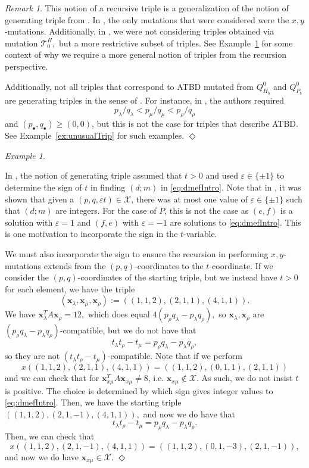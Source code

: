 \documentclass[11pt, reqno]{amsart}
\theoremstyle{remark}
\numberwithin{equation}{subsection}
\numberwithin{figure}{section}
\theoremstyle{customremark}
\newtheorem{rmk_no_diamond}[thm]{Remark}
\newenvironment{rmk}{\begin{rmk_no_diamond} } {\hfill$\er$ \end{rmk_no_diamond}}
\newtheorem{example_no_diamond}[thm]{Example}
\newenvironment{example}{\begin{example_no_diamond} } {\hfill$\er$ \end{example_no_diamond}}
\newcommand{\Tt}{\mathcal{T}}
\newcommand{\la}{{\lambda}}
\newcommand{\er}{{\Diamond}}
\newcommand{\eps}{\varepsilon}
\newcommand{\X}{\mathcal{X}}
\begin{document}
\begin{rmk}
    This notion of a recursive triple is a generalization of the notion of generating triple from \cite{MMW}. In \cite{MMW}, the only mutations that were considered were the $x,y$-mutations. Additionally, in \cite{MMW}, we were not considering triples obtained via mutation $\Tt_0^H,$ but a more restrictive subset of triples. See Example~\ref{ex:differentNotation} for some context of why we require a more general notion of triples from the recursion perspective. 
    
    Additionally, not all triples that correspond to ATBD mutated from $Q_{H_b}^0$ and $Q_{P_b}^0$ are generating triples in the sense of \cite{MMW}. For instance, in \cite{MMW}, the authors required
    \[ p_\la/q_\la<p_\mu/q_\mu<p_\rho/q_\rho\]
    and $(p_\bullet,q_\bullet)\geq(0,0)$, but this is not the case for triples that describe ATBD. See Example~\ref{ex:unusualTrip} for such examples.  
\end{rmk}

    \begin{example} \rm \label{ex:differentNotation}


In \cite{MMW}, the notion of generating triple assumed that $t>0$ and used $\eps \in \{\pm 1\}$ to determine the sign of $t$ in finding $(d;m)$ in \eqref{eq:dmefIntro}. Note that in \cite[Lemma 2.2.1]{MM}, it was shown that given a $(p,q,\eps t) \in \X$, there was at most one value of $\eps \in \{\pm 1\}$ such that $(d;m)$ are integers. For the case of $P$, this is not the case as $(e,f)$ is a solution with $\eps=1$ and $(f,e)$ with $\eps=-1$ are solutions to \eqref{eq:dmefIntro}. This is one motivation to incorporate the sign in the $t$-variable. 

We must also incorporate the sign to ensure the recursion in performing $x,y$-mutations extends from the $(p,q)$-coordinates to the $t$-coordinate. If we consider the $(p,q)$-coordinates of the starting triple, but we instead have $t>0$ for each element, we have the triple \[(\bm{x}_\la,\bm{x}_\mu,\bm{x}_\rho):=((1,1,2),(2,1,1),(4,1,1)).\] We have $\bm{x}_\la^T A\bm{x}_\rho=12,$ which does equal $4(p_\rho q_\la-p_\la q_\rho),$ so $\bm{x}_\la,\bm{x}_\rho$ are $(p_\rho q_\la-p_\la q_\rho)$-compatible, but we do not have that \[t_\la t_\rho-t_\mu=p_\rho q_\la-p_\la q_\rho,\] so they are not $(t_\la t_\rho-t_\mu)$-compatible. Note that if we perform \[x((1,1,2),(2,1,1),(4,1,1))=((1,1,2),(0,1,1),(2,1,1))\]
and we can check that for $\bm{x}_{x\mu}^TA\bm{x}_{x\mu} \neq 8$, i.e. $\bm{x}_{x\mu} \not\in \X.$ As such, we do not insist $t$ is positive. The choice is determined by which sign gives integer values to \eqref{eq:dmefIntro}. Then, we have the starting triple
$((1,1,2),(2,1,-1),(4,1,1)),$ and now we do have that 
\[ t_\la t_\rho-t_\mu=p_\rho q_\la-p_\la q_\rho.\] 
Then, we can check that 
\[ x((1,1,2),(2,1,-1),(4,1,1))=((1,1,2),(0,1,-3),(2,1,-1)),\]
and now we do have $\bm{x}_{x\mu} \in \X.$
\end{example}
 
\end{document}

